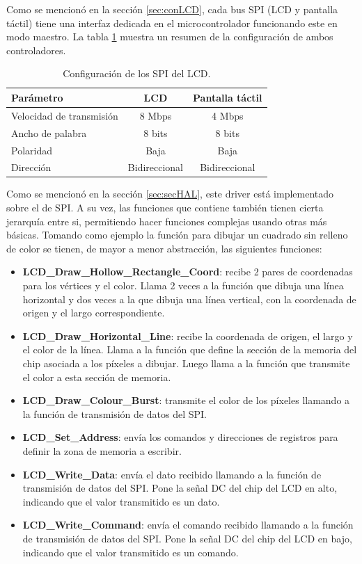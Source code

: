 Como se mencionó en la sección \ref{sec:conLCD}, cada bus SPI (LCD y pantalla táctil) tiene una interfaz dedicada en el microcontrolador funcionando este en modo maestro. La tabla \ref{tab:configSPI} muestra un resumen de la configuración de ambos controladores.

\begin{table}[H]
	\centering
	\caption{Configuración de los SPI del LCD.}
	\begin{tabular}{l c c}
		\toprule
		\textbf{Parámetro} & \textbf{LCD} & \textbf{Pantalla táctil} \\
		\midrule
		Velocidad de transmisión	& 8 Mbps & 4 Mbps	\\
		Ancho de palabra 				& 8 bits & 8 bits	    \\
		Polaridad							& Baja & Baja \\
		Dirección							& Bidireccional & Bidireccional \\
		\bottomrule
		\hline
	\end{tabular}
	\label{tab:configSPI}
\end{table}

Como se mencionó en la sección \ref{sec:secHAL}, este driver está implementado sobre el de SPI. A su vez, las funciones que contiene también tienen cierta jerarquía entre si, permitiendo hacer funciones complejas usando otras más básicas. Tomando como ejemplo la función para dibujar un cuadrado sin relleno de color se tienen, de mayor a menor abstracción, las siguientes funciones:

\begin{itemize}
\item \textbf{LCD\_Draw\_Hollow\_Rectangle\_Coord}: recibe 2 pares de coordenadas para los vértices y el color. Llama 2 veces a la función que dibuja una línea horizontal y dos veces a la que dibuja una línea vertical, con la coordenada de origen y el largo correspondiente.
\item \textbf{LCD\_Draw\_Horizontal\_Line}: recibe la coordenada de origen, el largo y el color de la línea. Llama a la función que define la sección de la memoria del chip asociada a los píxeles a dibujar. Luego llama a la función que transmite el color a esta sección de memoria.
\item \textbf{LCD\_Draw\_Colour\_Burst}: transmite el color de los píxeles llamando a la función de transmisión de datos del SPI.
\item \textbf{LCD\_Set\_Address}: envía los comandos y direcciones de registros para definir la zona de memoria a escribir.
\item \textbf{LCD\_Write\_Data}: envía el dato recibido llamando a la función de transmisión de datos del SPI. Pone la señal DC del chip del LCD en alto, indicando que el valor transmitido es un dato.
\item \textbf{LCD\_Write\_Command}: envía el comando recibido llamando a la función de transmisión de datos del SPI. Pone la señal DC del chip del LCD en bajo, indicando que el valor transmitido es un comando.
\end{itemize}


